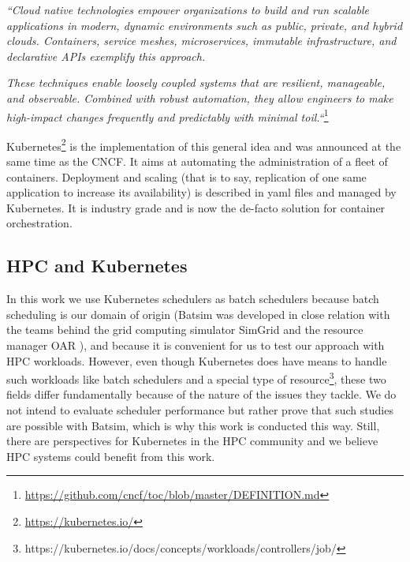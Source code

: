 \textit{``Cloud native technologies empower organizations to build and run
	scalable applications in modern, dynamic environments such as public,
	private, and hybrid clouds. Containers, service meshes, microservices,
	immutable infrastructure, and declarative APIs exemplify this
	approach.}

\textit{These techniques enable loosely coupled systems that
	are resilient, manageable, and observable.  Combined with robust
	automation, they allow engineers to make high-impact changes frequently
	and predictably with minimal toil.``}\footnote{\url{https://github.com/cncf/toc/blob/master/DEFINITION.md}}

Kubernetes\footnote{\url{https://kubernetes.io/}} is the implementation of this
general idea and was announced at the same time as the CNCF. It aims at
automating the administration of a fleet of containers. Deployment and scaling
(that is to say, replication of one same application to increase its
availability) is described in yaml files and managed by Kubernetes.  It is
industry grade and is now the de-facto solution for container orchestration.

\subsection{HPC and Kubernetes}

In this work we use Kubernetes schedulers as batch schedulers because batch
scheduling is our domain of origin (Batsim was developed in close relation with
	the teams behind the grid computing simulator
	SimGrid\cite{casanova:hal-01017319} and the resource manager OAR
\cite{oar}), and because it is convenient for us to test our approach with HPC
workloads. However, even though Kubernetes does have means to handle such
workloads like batch schedulers \cite{kube-batch} and a special type of
resource\footnote{https://kubernetes.io/docs/concepts/workloads/controllers/job/},
these two fields differ fundamentally because of the nature of the issues they
tackle. We do not intend to evaluate scheduler performance but rather prove
that such studies are possible with Batsim, which is why this work is conducted
this way. Still, there are perspectives for Kubernetes in the HPC community and
we believe HPC systems could benefit from this work.

